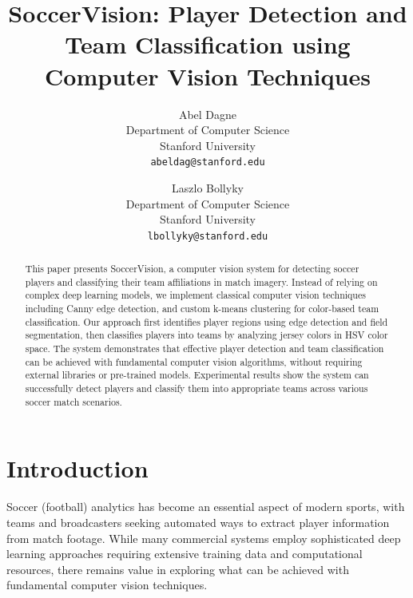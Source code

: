 \documentclass[10pt,twocolumn,letterpaper]{article}
\begin{document}
\title{SoccerVision: Player Detection and Team Classification using Computer Vision Techniques}

\author{Abel Dagne\\
Department of Computer Science\\
Stanford University\\
{\tt\small abeldag@stanford.edu}
\and
Laszlo Bollyky\\
Department of Computer Science\\
Stanford University\\
{\tt\small lbollyky@stanford.edu}
}
\maketitle

\begin{abstract}
   This paper presents SoccerVision, a computer vision system for detecting soccer players and classifying their team affiliations in match imagery. Instead of relying on complex deep learning models, we implement classical computer vision techniques including Canny edge detection, and custom k-means clustering for color-based team classification. Our approach first identifies player regions using edge detection and field segmentation, then classifies players into teams by analyzing jersey colors in HSV color space. The system demonstrates that effective player detection and team classification can be achieved with fundamental computer vision algorithms, without requiring external libraries or pre-trained models. Experimental results show the system can successfully detect players and classify them into appropriate teams across various soccer match scenarios.
\end{abstract}

\section{Introduction}
\label{sec:intro}

Soccer (football) analytics has become an essential aspect of modern sports, with teams and broadcasters seeking automated ways to extract player information from match footage. While many commercial systems employ sophisticated deep learning approaches requiring extensive training data and computational resources, there remains value in exploring what can be achieved with fundamental computer vision techniques.
\end{document}

